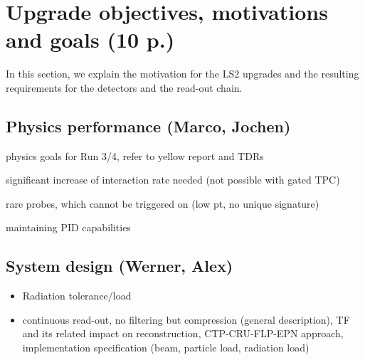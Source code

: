 \section{Upgrade objectives, motivations and goals (10 p.)}

In this section, we explain the motivation for the LS2 upgrades and the
resulting requirements for the detectors and the read-out chain.

\subsection{Physics performance (Marco, Jochen)}

physics goals for Run 3/4, refer to yellow report and TDRs~\cite{Citron:2018lsq}

significant increase of interaction rate needed (not possible with gated TPC)

rare probes, which cannot be triggered on (low pt, no unique signature)

maintaining PID capabilities

\subsection{System design (Werner, Alex)}
\begin{itemize}
\item Radiation tolerance/load
\item continuous read-out, no filtering but compression (general description), TF and its related impact on reconstruction, CTP-CRU-FLP-EPN approach, implementation specification (beam, particle load, radiation load)
\end{itemize}
